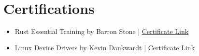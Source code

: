 \documentclass[10pt, letterpaper]{article}
\begin{document}
\section{Certifications}
\begin{itemize}[leftmargin=6mm]
	\setlength\itemsep{0em}
	\item{Rust Essential Training by Barron Stone} | \href{https://www.linkedin.com/learning/certificates/5b0eb9a5191ed3a4cb605f7b8b9e5864ed123e5b13b5f8f68bfc99b6ff8cd87d?trk=share_certificate}{\underline {Certificate Link} \faExternalLink}
	\item{Linux Device Drivers by Kevin Dankwardt} | \href{https://www.linkedin.com/learning/certificates/ef2284b25b44e40cdb305a085b6a77f7a4f0eac3762a844f5530279dd01a9549?trk=share_certificate}{\underline {Certificate Link} \faExternalLink}
\end{itemize}
\end{document}
